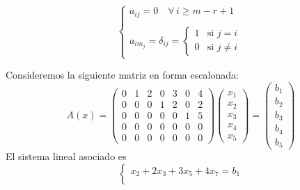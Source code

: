 \documentclass[12pt,a4paper]{book}
\begin{document}
    \begin{equation*}
    \left\{
        \begin{array}{l}
            a_{ij} = 0 \quad \forall\, i \geq m - r + 1 \\
            \\
            a_{i m_{j}} = \delta_{ij} =
            \begin{cases}
                1 & \text{si } j = i \\
                0 & \text{si } j \ne i
            \end{cases}
        \end{array}
    \right.
    \end{equation*}
    \begin{ejemplo}
    \label{ej:10}
        Consideremos la siguiente matriz en forma escalonada:
        \begin{equation*}
            A(x)=
            \begin{pmatrix}
                0 & 1 & 2 & 0 & 3 & 0 & 4\\
                0 & 0 & 0 & 1 & 2 & 0 & 2\\
                0 & 0 & 0 & 0 & 0 & 1 & 5\\
                0 & 0 & 0 & 0 & 0 & 0 & 0\\
                0 & 0 & 0 & 0 & 0 & 0 & 0
            \end{pmatrix}
            \begin{pmatrix}
                x_{1}\\
                x_{2}\\
                x_{3}\\
                x_{4}\\
                x_{5}
            \end{pmatrix}
            =
            \begin{pmatrix}
                b_{1}\\
                b_{2}\\
                b_{3}\\
                b_{4}\\
                b_{5}
            \end{pmatrix}
        \end{equation*}
        El sistema lineal asociado es
        \begin{equation*}
            \begin{cases}
                x_{2}+2x_{3}+3x_{5}+4x_{7}=b_{1}\\

\end{cases}
\end{equation*}
\end{ejemplo}
\end{document}
